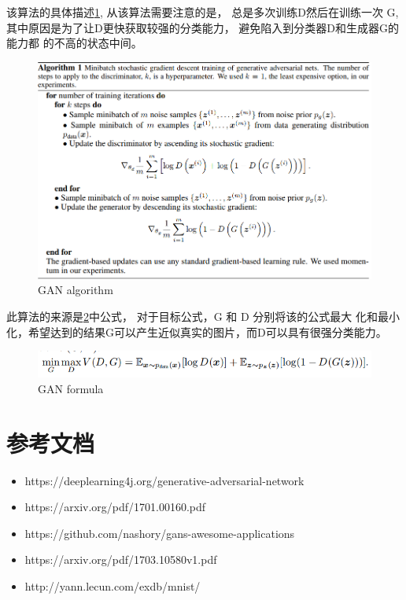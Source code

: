 该算法的具体描述\ref{algo-1}, 从该算法需要注意的是， 总是多次训练D然后在训练一次
G, 其中原因是为了让D更快获取较强的分类能力， 避免陷入到分类器D和生成器G的能力都
的不高的状态中间。
\begin{figure}[!hbt]
    \includegraphics[width=\linewidth]{pic/algo-1.png}
    \caption{GAN algorithm}
    \label{algo-1}
\end{figure}
\newline
此算法的来源是\ref{formualtion}中公式， 对于目标公式，G 和 D 分别将该的公式最大
化和最小化，希望达到的结果G可以产生近似真实的图片，而D可以具有很强分类能力。
\begin{figure}[!hbt]
    \includegraphics[width=\linewidth]{pic/for.png}
    \caption{GAN formula}
    \label{formualtion}
\end{figure}
\newline


\section{参考文档}
\begin{itemize}
    \item https://deeplearning4j.org/generative-adversarial-network
    \item https://arxiv.org/pdf/1701.00160.pdf
    \item https://github.com/nashory/gans-awesome-applications
    \item https://arxiv.org/pdf/1703.10580v1.pdf
    \item http://yann.lecun.com/exdb/mnist/
\end{itemize}
